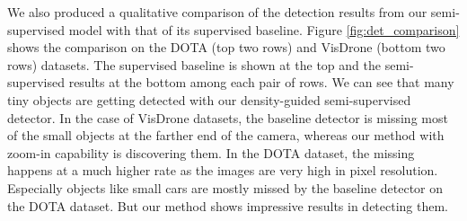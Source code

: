 \begin{table*}
    \centering
    \caption{Performance comparison of our density crop guided semi-supervised object detection with 1\%, 5\%, and 10\% labeled images on the DOTA dataset. SSOD - semi-supervised detection with mean-teacher, Crop(L) - density crops on the labeled images, Crop (L + U) - density crops on the labeled and unlabeled images.}    
    \label{table:diff_sup_data_dota}
\end{table*}

We also produced a qualitative comparison of the detection results from our semi-supervised model with that of its supervised baseline. Figure \ref{fig:det_comparison} shows the comparison on the DOTA (top two rows) and VisDrone (bottom two rows) datasets. The supervised baseline is shown at the top and the semi-supervised results at the bottom among each pair of rows. We can see that many tiny objects are getting detected with our density-guided semi-supervised detector. In the case of VisDrone datasets, the baseline detector is missing most of the small objects at the farther end of the camera, whereas our method with zoom-in capability is discovering them. In the DOTA dataset, the missing happens at a much higher rate as the images are very high in pixel resolution. Especially objects like small cars are mostly missed by the baseline detector on the DOTA dataset. But our method shows impressive results in detecting them.

